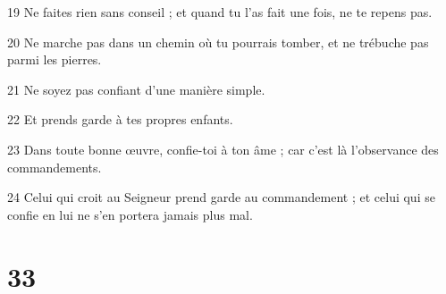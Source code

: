 \par 19 Ne faites rien sans conseil ; et quand tu l'as fait une fois, ne te repens pas.
\par 20 Ne marche pas dans un chemin où tu pourrais tomber, et ne trébuche pas parmi les pierres.
\par 21 Ne soyez pas confiant d'une manière simple.
\par 22 Et prends garde à tes propres enfants.
\par 23 Dans toute bonne œuvre, confie-toi à ton âme ; car c'est là l'observance des commandements.
\par 24 Celui qui croit au Seigneur prend garde au commandement ; et celui qui se confie en lui ne s'en portera jamais plus mal.

\chapter{33}

